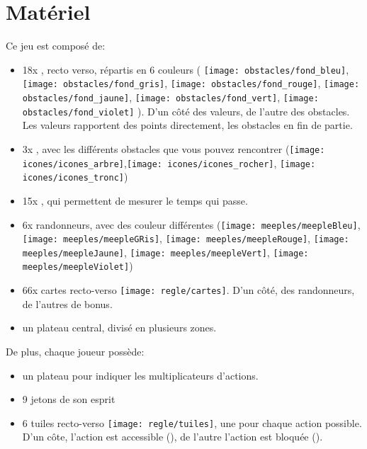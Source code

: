 \section*{Matériel} \label{sec:Matériel}

Ce jeu est composé de:
\begin{itemize}
\item 18x \jetonsObstacles, recto verso, répartis en 6 couleurs ( \texttt{[image: obstacles/fond\_bleu]}, 
\texttt{[image: obstacles/fond\_gris]}, \texttt{[image: obstacles/fond\_rouge]}, \texttt{[image: obstacles/fond\_jaune]}, \texttt{[image: obstacles/fond\_vert]}, \texttt{[image: obstacles/fond\_violet]} ). D'un côté des valeurs, de l'autre des obstacles. Les valeurs rapportent des points directement, les obstacles en fin de partie.
\item 3x \marqueursObstacles, avec les différents obstacles que vous pouvez rencontrer (\texttt{[image: icones/icones\_arbre]},\texttt{[image: icones/icones\_rocher]}, \texttt{[image: icones/icones\_tronc]})
\item 15x \jetonsMeteo, qui permettent de mesurer le temps qui passe.
\item 6x randonneurs, avec des couleur différentes (\texttt{[image: meeples/meepleBleu]}, \texttt{[image: meeples/meepleGRis]}, \texttt{[image: meeples/meepleRouge]}, \texttt{[image: meeples/meepleJaune]}, \texttt{[image: meeples/meepleVert]}, \texttt{[image: meeples/meepleViolet]})
\item 66x cartes recto-verso \texttt{[image: regle/cartes]}. D'un côté, des randonneurs, de l'autres de bonus.
\item un plateau central, divisé en plusieurs zones.
\end{itemize}

De plus, chaque joueur possède:
\begin{itemize}
\item un plateau pour indiquer les multiplicateurs d'actions.
\item 9 jetons de son esprit
\item 6 tuiles recto-verso \texttt{[image: regle/tuiles]}, une pour chaque action possible. D'un côte, l'action est accessible (\tuileActive), de l'autre l'action est bloquée (\tuileBloquee).
\end{itemize}
\FloatBarrier
